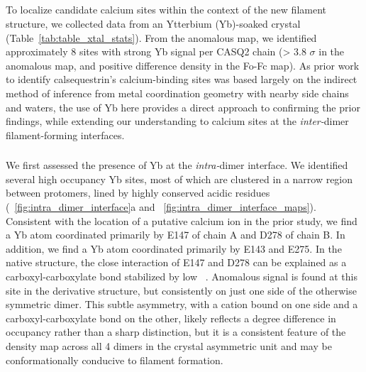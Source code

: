\subsection{\headingsubsectionfourandfive}
To localize candidate calcium sites within the context of the new filament structure, we collected data from an Ytterbium (Yb)-soaked crystal (Table~\ref{tab:table_xtal_stats}). From the anomalous map, we identified approximately 8 sites with strong Yb signal per CASQ2 chain (> 3.8 $\sigma$ in the anomalous map, and positive difference density in the Fo-Fc map). As prior work to identify calsequestrin's calcium-binding sites was based largely on the indirect method of inference from metal coordination geometry with nearby side chains and waters\supercite{Sanchez2012-qi}, the use of Yb here provides a direct approach to confirming the prior findings, while extending our understanding to calcium sites at the \textit{inter-}dimer filament-forming interfaces. %

\subsubsection{\headingsubsubsectionfour}
% 
We first assessed the presence of Yb at the \textit{intra-}dimer interface. We identified several high occupancy Yb sites, most of which are clustered in a narrow region between protomers, lined by highly conserved acidic residues (\maintextfigure~\ref{fig:intra_dimer_interface}a and \extendeddatafigure~\ref{fig:intra_dimer_interface_maps}). Consistent with the location of a putative calcium ion in the prior study, we find a Yb atom coordinated primarily by E147 of chain A and D278 of chain B. In addition, we find a Yb atom coordinated primarily by E143 and E275. In the native structure, the close interaction of E147 and D278 can be explained as a carboxyl-carboxylate bond stabilized by low \pH\ \supercite{Krause1991-le,Sawyer1982-sm}. Anomalous signal is found at this site in the derivative structure, but consistently on just one side of the otherwise symmetric dimer. This subtle asymmetry, with a cation bound on one side and a carboxyl-carboxylate bond on the other, likely reflects a degree difference in occupancy rather than a sharp distinction, but it is a consistent feature of the density map across all 4 dimers in the crystal asymmetric unit and may be conformationally conducive to filament formation.

